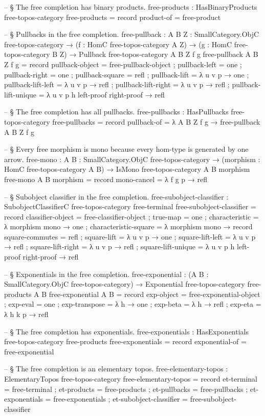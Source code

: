 \documentclass[11pt]{article}
\begin{document}
\begin{code}
-- § The free completion has binary products.
free-products : HasBinaryProducts free-topos-category
free-products = record
  { product-of = free-product
  }

-- § Pullbacks in the free completion.
free-pullback :
  {A B Z : SmallCategory.ObjC free-topos-category} →
  (f : HomC free-topos-category A Z) →
  (g : HomC free-topos-category B Z) →
  Pullback free-topos-category {A} {B} {Z} f g
free-pullback {A} {B} {Z} f g = record
  { pullback-object      = free-pullback-object
  ; pullback-left        = one
  ; pullback-right       = one
  ; pullback-square      = refl
  ; pullback-lift        = λ u v p → one
  ; pullback-lift-left   = λ u v p → refl
  ; pullback-lift-right  = λ u v p → refl
  ; pullback-lift-unique = λ u v p h left-proof right-proof → refl
  }

-- § The free completion has all pullbacks.
free-pullbacks : HasPullbacks free-topos-category
free-pullbacks = record
  { pullback-of = λ {A} {B} {Z} f g → free-pullback {A} {B} {Z} f g
  }

-- § Every free morphism is mono because every hom-type is generated by one arrow.
free-mono :
  {A B : SmallCategory.ObjC free-topos-category} →
  (morphism : HomC free-topos-category A B) →
  IsMono free-topos-category {A} {B} morphism
free-mono {A} {B} morphism = record
  { mono-cancel = λ f g p → refl
  }

-- § Subobject classifier in the free completion.
free-subobject-classifier :
  SubobjectClassifierC free-topos-category free-terminal
free-subobject-classifier = record
  { classifier-object = free-classifier-object
  ; true-map          = one
  ; characteristic    = λ morphism mono → one
  ; characteristic-square = λ morphism mono → record
      { square-commutes    = refl
      ; square-lift        = λ u v p → one
      ; square-lift-left   = λ u v p → refl
      ; square-lift-right  = λ u v p → refl
      ; square-lift-unique = λ u v p h left-proof right-proof → refl
      }
  }

-- § Exponentials in the free completion.
free-exponential :
  (A B : SmallCategory.ObjC free-topos-category) →
  Exponential free-topos-category free-products A B
free-exponential A B = record
  { exp-object    = free-exponential-object
  ; exp-eval      = one
  ; exp-transpose = λ h → one
  ; exp-beta      = λ h → refl
  ; exp-eta       = λ h k p → refl
  }

-- § The free completion has exponentials.
free-exponentials : HasExponentials free-topos-category free-products
free-exponentials = record
  { exponential-of = free-exponential
  }

-- § The free completion is an elementary topos.
free-elementary-topos : ElementaryTopos free-topos-category
free-elementary-topos = record
  { et-terminal             = free-terminal
  ; et-products             = free-products
  ; et-pullbacks            = free-pullbacks
  ; et-exponentials         = free-exponentials
  ; et-subobject-classifier = free-subobject-classifier
  }
\end{code}
\end{document}

